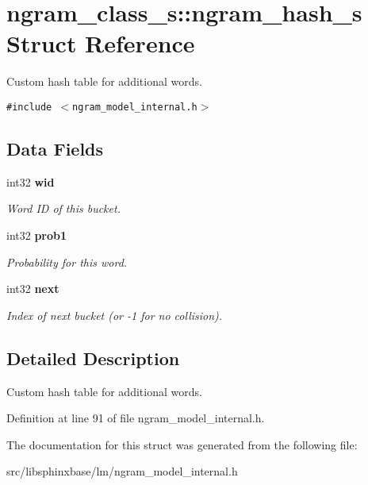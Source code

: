 \section{ngram\_\-class\_\-s::ngram\_\-hash\_\-s Struct Reference}
\label{structngram__class__s_1_1ngram__hash__s}
Custom hash table for additional words.  


{\tt \#include $<$ngram\_\-model\_\-internal.h$>$}

\subsection*{Data Fields}
\begin{CompactItemize}
\item 
int32 {\bf wid}\label{structngram__class__s_1_1ngram__hash__s_d0178b5a86ec23ce790b6b7cb64db0b9}

\begin{CompactList}\small\item\em Word ID of this bucket. \item\end{CompactList}\item 
int32 {\bf prob1}\label{structngram__class__s_1_1ngram__hash__s_6ac4c01b0c8d29f770f4780e38ab0923}

\begin{CompactList}\small\item\em Probability for this word. \item\end{CompactList}\item 
int32 {\bf next}\label{structngram__class__s_1_1ngram__hash__s_88ede5798cadc2bece12c49fa038b090}

\begin{CompactList}\small\item\em Index of next bucket (or -1 for no collision). \item\end{CompactList}\end{CompactItemize}


\subsection{Detailed Description}
Custom hash table for additional words. 

Definition at line 91 of file ngram\_\-model\_\-internal.h.

The documentation for this struct was generated from the following file:\begin{CompactItemize}
\item 
src/libsphinxbase/lm/ngram\_\-model\_\-internal.h\end{CompactItemize}
